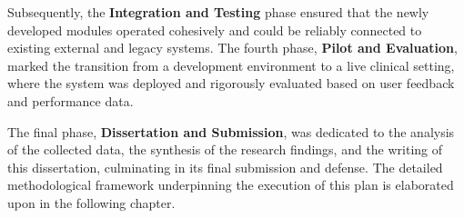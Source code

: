 Subsequently, the \textbf{Integration and Testing} phase ensured that the newly developed modules operated cohesively and could be reliably connected to existing external and legacy systems. The fourth phase, \textbf{Pilot and Evaluation}, marked the transition from a development environment to a live clinical setting, where the system was deployed and rigorously evaluated based on user feedback and performance data.

The final phase, \textbf{Dissertation and Submission}, was dedicated to the analysis of the collected data, the synthesis of the research findings, and the writing of this dissertation, culminating in its final submission and defense. The detailed methodological framework underpinning the execution of this plan is elaborated upon in the following chapter. 